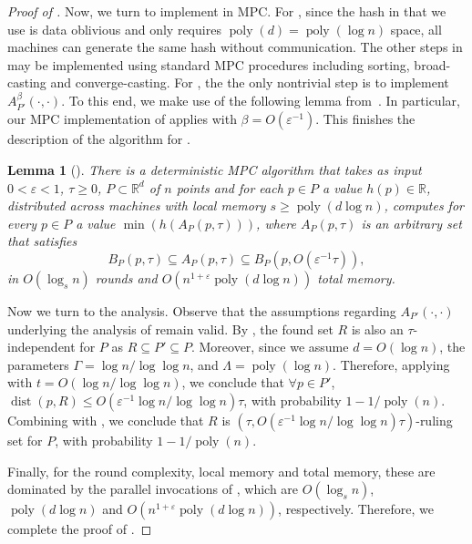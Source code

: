 \documentclass[11pt,letterpaper]{article}
\theoremstyle{plain}
\newtheorem{lemma}[theorem]{Lemma}
\theoremstyle{definition}
\theoremstyle{remark}
\DeclareMathOperator{\poly}{poly}
\DeclareMathOperator{\dist}{dist}
\renewcommand{\epsilon}{\ensuremath{\varepsilon}}
\let\epsilon\varepsilon
\begin{document}
\begin{proof}[Proof of ]
        Now, we turn to implement  in MPC.
        For , since the hash in  that we use is data oblivious and only requires $\poly(d) = \poly(\log n)$ space,
        all machines can generate the same hash without communication.
        The other steps in  may be implemented using standard MPC procedures including sorting, broad-casting and converge-casting.
        For ,
        the the only nontrivial step is to implement $A_{P'}^{\beta}(\cdot, \cdot)$.
        To this end, we make use of the following lemma from~\cite{CGJKV24}.
In particular, our MPC implementation of  applies  with $\beta = O(\varepsilon^{-1})$.
        This finishes the description of the algorithm for .
\begin{lemma}[{\cite[Theorem 3.1]{CGJKV24}}]
    \label{lemma:geometric_aggregation}
    There is a deterministic MPC algorithm that takes as input
    $0 < \epsilon < 1$, $\tau\geq 0$, $P\subset \mathbb{R}^{d}$ of $n$ points and for each $p \in P$ a value $h(p) \in \mathbb{R}$,
    distributed across machines with local memory $s\geq \poly(d\log n)$,
    computes for every $p\in P$ a value $\min(h(A_{P}(p, \tau)))$, where $A_{P}(p, \tau)$ is an arbitrary set that satisfies 
    \begin{equation}
        B_{P}(p, \tau)\subseteq A_{P}(p, \tau)\subseteq B_{P}(p,  O(\epsilon^{-1} \tau )),
    \end{equation}
    in $O(\log_{s} n)$ rounds and $O(n^{1 + \epsilon}\poly(d\log n))$ total memory.
\end{lemma}

        Now we turn to the analysis.
        Observe that the assumptions regarding $A_{P'}(\cdot, \cdot)$
        underlying the analysis of  remain valid.
        By , the found set $R$ is also an $\tau$-independent for $P$ as $R \subseteq P' \subseteq P$.
        Moreover, since we assume $d = O(\log n)$, the parameters $\Gamma = \log n / \log\log n$,
        and $\Lambda = \poly(\log n)$.
        Therefore, applying  with $t = O(\log n / \log\log n)$,
        we conclude that $\forall p \in P'$, $\dist(p, R) \leq O(\epsilon^{-1} \log n / \log\log n) \tau$,
        with probability $1 - 1 / \poly(n)$.
        Combining with ,
        we conclude that $R$ is $(\tau, O(\epsilon^{-1}\log n / \log\log n)\tau)$-ruling set for $P$,
        with probability $1 - 1 / \poly(n)$.







        
Finally, for the round complexity, local memory and total memory, these are dominated by the parallel invocations of , which are $O(\log_{s} n)$, $\poly(d\log n)$ and $O(n^{1+\varepsilon}\poly(d\log n))$, respectively.  
        Therefore, we complete the proof of . 
\end{proof}
\end{document}
